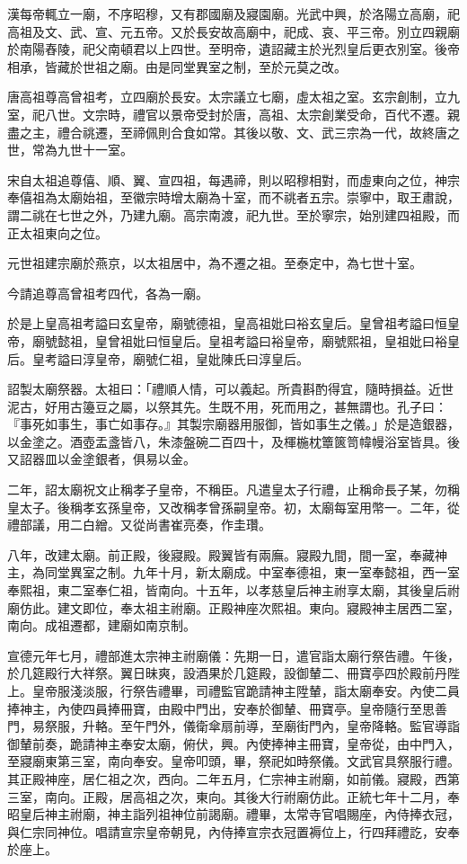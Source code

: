 漢每帝輒立一廟，不序昭穆，又有郡國廟及寢園廟。光武中興，於洛陽立高廟，祀高祖及文、武、宣、元五帝。又於長安故高廟中，祀成、哀、平三帝。別立四親廟於南陽舂陵，祀父南頓君以上四世。至明帝，遺詔藏主於光烈皇后更衣別室。後帝相承，皆藏於世祖之廟。由是同堂異室之制，至於元莫之改。

唐高祖尊高曾祖考，立四廟於長安。太宗議立七廟，虛太祖之室。玄宗創制，立九室，祀八世。文宗時，禮官以景帝受封於唐，高祖、太宗創業受命，百代不遷。親盡之主，禮合祧遷，至禘佩則合食如常。其後以敬、文、武三宗為一代，故終唐之世，常為九世十一室。

宋自太祖追尊僖、順、翼、宣四祖，每遇禘，則以昭穆相對，而虛東向之位，神宗奉僖祖為太廟始祖，至徽宗時增太廟為十室，而不祧者五宗。崇寧中，取王肅說，謂二祧在七世之外，乃建九廟。高宗南渡，祀九世。至於寧宗，始別建四祖殿，而正太祖東向之位。

元世祖建宗廟於燕京，以太祖居中，為不遷之祖。至泰定中，為七世十室。

今請追尊高曾祖考四代，各為一廟。

於是上皇高祖考謚曰玄皇帝，廟號德祖，皇高祖妣曰裕玄皇后。皇曾祖考謚曰恒皇帝，廟號懿祖，皇曾祖妣曰恒皇后。皇祖考謚曰裕皇帝，廟號熙祖，皇祖妣曰裕皇后。皇考謚曰淳皇帝，廟號仁祖，皇妣陳氏曰淳皇后。

詔製太廟祭器。太祖曰：「禮順人情，可以義起。所貴斟酌得宜，隨時損益。近世泥古，好用古籩豆之屬，以祭其先。生既不用，死而用之，甚無謂也。孔子曰：『事死如事生，事亡如事存。』其製宗廟器用服御，皆如事生之儀。」於是造銀器，以金塗之。酒壺盂盞皆八，朱漆盤碗二百四十，及楎椸枕簟篋笥幃幔浴室皆具。後又詔器皿以金塗銀者，俱易以金。

二年，詔太廟祝文止稱孝子皇帝，不稱臣。凡遣皇太子行禮，止稱命長子某，勿稱皇太子。後稱孝玄孫皇帝，又改稱孝曾孫嗣皇帝。初，太廟每室用幣一。二年，從禮部議，用二白繒。又從尚書崔亮奏，作圭瓚。

八年，改建太廟。前正殿，後寢殿。殿翼皆有兩廡。寢殿九間，間一室，奉藏神主，為同堂異室之制。九年十月，新太廟成。中室奉德祖，東一室奉懿祖，西一室奉熙祖，東二室奉仁祖，皆南向。十五年，以孝慈皇后神主祔享太廟，其後皇后祔廟仿此。建文即位，奉太祖主祔廟。正殿神座次熙祖。東向。寢殿神主居西二室，南向。成祖遷都，建廟如南京制。

宣德元年七月，禮部進太宗神主祔廟儀：先期一日，遣官詣太廟行祭告禮。午後，於几筵殿行大祥祭。翼日昧爽，設酒果於几筵殿，設御輦二、冊寶亭四於殿前丹陛上。皇帝服淺淡服，行祭告禮畢，司禮監官跪請神主陞輦，詣太廟奉安。內使二員捧神主，內使四員捧冊寶，由殿中門出，安奉於御輦、冊寶亭。皇帝隨行至思善門，易祭服，升輅。至午門外，儀衛傘扇前導，至廟街門內，皇帝降輅。監官導詣御輦前奏，跪請神主奉安太廟，俯伏，興。內使捧神主冊寶，皇帝從，由中門入，至寢廟東第三室，南向奉安。皇帝叩頭，畢，祭祀如時祭儀。文武官具祭服行禮。其正殿神座，居仁祖之次，西向。二年五月，仁宗神主祔廟，如前儀。寢殿，西第三室，南向。正殿，居高祖之次，東向。其後大行祔廟仿此。正統七年十二月，奉昭皇后神主祔廟，神主詣列祖神位前謁廟。禮畢，太常寺官唱賜座，內侍捧衣冠，與仁宗同神位。唱請宣宗皇帝朝見，內侍捧宣宗衣冠置褥位上，行四拜禮訖，安奉於座上。

